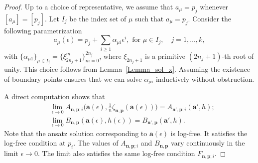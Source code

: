 \documentclass[11pt]{amsart}
\theoremstyle{remark}
\numberwithin{equation}{section}
\begin{document}
\begin{proof}
Up to a choice of representative, we assume that $a_\mu = p_j$ whenever $[a_\mu] = [p_j]$. Let $I_j$ be the index set of $\mu$ such that $a_\mu = p_j$.
Consider the following parametrization
\[
    a_\mu(\epsilon) = p_j + \sum_{i \geq 1} \alpha_{\mu i} \epsilon^i, \text{ for }\mu \in I_j, \quad j=1,\dots,k,
\]
with $\{\alpha_{\mu 1}\}_{\mu \in I_j} = \{ \xi_{2n_j+1}^m \}_{m=0}^{2n_j}$, where $\xi_{2n_j+1}$ is a primitive $(2n_j+1)$-th root of unity. This choice follows from Lemma~\ref{Lemma_sol_x}. Assuming the existence of boundary points ensures that we can solve $\alpha_{\mu i}$ inductively without obstruction. 

A direct computation shows that  
\[
\begin{split}
    &\lim_{\epsilon \rightarrow 0} A_{\mathbf{n},\mathbf{p};i} \Big(\mathbf{a}(\epsilon), \frac{1}{n} \zeta_{\mathbf{n},\mathbf{p}}( \mathbf{a}(\epsilon) )  \Big) = A_{\mathbf{n}',\mathbf{p};i}(\mathbf{a}',h);
    \\
    &\lim_{\epsilon \rightarrow 0} B_{\mathbf{n},\mathbf{p}} (\mathbf{a}(\epsilon), h(\epsilon))  = B_{\mathbf{n}',\mathbf{p}}(\mathbf{a}',h).
\end{split}
\]
Note that the ansatz solution corresponding to $\mathbf{a}(\epsilon)$ is log-free. It satisfies the log-free condition at $p_i$. The values of $A_{\mathbf{n},\mathbf{p};i}$ and $B_{\mathbf{n},\mathbf{p}}$ vary continuously in the limit $\epsilon \rightarrow 0$. The limit also satisfies the same log-free condition $F_{\mathbf{n},\mathbf{p};i}$.  
\end{proof}
\end{document}
